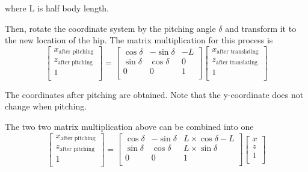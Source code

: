 where L is half body length.

Then, rotate the coordinate system by the pitching angle $\delta$ and transform it to the new location of the hip. The matrix multiplication for this process is
\begin{equation}
   \begin{bmatrix}
   x_\text{after pitching} \\
   z_\text{after pitching} \\
   1                       \\
   \end{bmatrix}
   =
   \begin{bmatrix}
   \cos\delta & -\sin\delta & -L \\
   \sin\delta & \cos\delta & 0 \\
   0 & 0 & 1 \\
   \end{bmatrix}
   \begin{bmatrix}
   x_\text{after translating} \\
   z_\text{after translating} \\
   1                          \\
   \end{bmatrix}
\end{equation}

The coordinates after pitching are obtained. Note that the y-coordinate does not change when pitching.

The two two matrix multiplication above can be combined into one
\begin{equation}\label{eq:pitching_fr_leg}
   \begin{bmatrix}
   x_\text{after pitching} \\
   z_\text{after pitching} \\
   1                       \\
   \end{bmatrix}
   =
   \begin{bmatrix}
   \cos\delta & -\sin\delta & L \times \cos\delta - L \\
   \sin\delta & \cos\delta & L \times \sin\delta \\
   0 & 0 & 1 \\
   \end{bmatrix}
   \begin{bmatrix}
   x \\
   z \\
   1 \\
   \end{bmatrix}
\end{equation}

